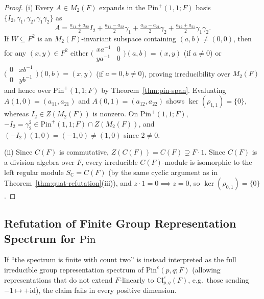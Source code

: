 \documentclass[11pt,a4paper]{article}
\theoremstyle{plain}
\theoremstyle{definition}
\newcommand{\Cl}{\mathrm{Cl}}
\newcommand{\Pin}{\mathrm{Pin}}
\newcommand{\C}{\mathbb{C}}
\begin{document}
\begin{proof}
(i) Every $A \in M_2(F)$ expands in the $\Pin^+(1,1;F)$ basis $\{I_2, \gamma_1, \gamma_2, \gamma_1\gamma_2\}$ as
\[
  A = \tfrac{a_{11}+a_{22}}{2} I_2 + \tfrac{a_{11}-a_{22}}{2}\gamma_1 + \tfrac{a_{12}-a_{21}}{2}\gamma_2 + \tfrac{a_{12}+a_{21}}{2}\gamma_1\gamma_2.
\]
If $W \subseteq F^2$ is an $M_2(F)$-invariant subspace containing $(a,b) \neq (0,0)$, then for any $(x,y) \in F^2$ either $\bigl(\begin{smallmatrix}xa^{-1} & 0\\ ya^{-1} & 0\end{smallmatrix}\bigr)(a,b) = (x,y)$ (if $a \neq 0$) or $\bigl(\begin{smallmatrix}0 & xb^{-1}\\ 0 & yb^{-1}\end{smallmatrix}\bigr)(0,b) = (x,y)$ (if $a = 0, b \neq 0$), proving irreducibility over $M_2(F)$ and hence over $\Pin^+(1,1;F)$ by Theorem~\ref{thm:pin-span}. Evaluating $A(1,0) = (a_{11}, a_{21})$ and $A(0,1) = (a_{12}, a_{22})$ shows $\ker(\rho_{1,1}) = \{0\}$, whereas $I_2 \in Z(M_2(F))$ is nonzero. On $\Pin^+(1,1;F)$, $-I_2 = \gamma_2^2 \in \Pin^+(1,1;F) \cap Z(M_2(F))$, and $(-I_2)(1,0) = (-1,0) \neq (1,0)$ since $2 \neq 0$.

(ii) Since $C(F)$ is commutative, $Z(C(F)) = C(F) \supsetneq F \cdot 1$. Since $C(F)$ is a division algebra over $F$, every irreducible $C(F)$-module is isomorphic to the left regular module $S_{\C} = C(F)$ (by the same cyclic argument as in Theorem~\ref{thm:quat-refutation}(iii)), and $z \cdot 1 = 0 \implies z = 0$, so $\ker(\rho_{0,1}) = \{0\}$.
\end{proof}

\subsection{Refutation of Finite Group Representation Spectrum for \texorpdfstring{$\Pin$}{Pin}}

If ``the spectrum is finite with count two'' is instead interpreted as the full irreducible group representation spectrum of $\Pin^\varepsilon(p,q; F)$ (allowing representations that do not extend $F$-linearly to $\Cl_{p,q}^\varepsilon(F)$, e.g.\ those sending $-1 \mapsto +\mathrm{id}$), the claim fails in every positive dimension.
\end{document}
